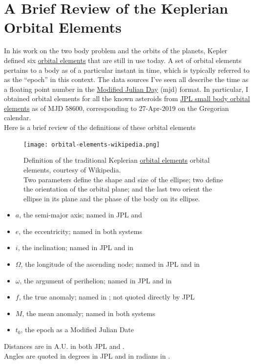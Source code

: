 \section{A Brief Review of the Keplerian Orbital Elements}
\label{section_orbital_elements}
In his work on the two body problem and the orbits of the planets, Kepler defined six 
\href{https://en.wikipedia.org/wiki/Orbital_elements}{orbital elements}
that are still in use today.
A set of orbital elements pertains to a body as of a particular instant in time, which is typically referred to as the ``epoch'' in this context.
The data sources I've seen all describe the time as a floating point number in the \href{https://en.wikipedia.org/wiki/Julian_day}{Modified Julian Day} (mjd) format.
In particular, I obtained orbital elements for all the known asteroids from \href{https://ssd.jpl.nasa.gov/?sb_elem}{JPL small body orbital elements}
as of MJD 58600, corresponding to 27-Apr-2019 on the Gregorian calendar.\\
Here is a brief review of the definitions of these orbital elements

\begin{figure}
\begin{center}
\texttt{[image: orbital-elements-wikipedia.png]}
\caption{Definition of the traditional Keplerian
\href{https://en.wikipedia.org/wiki/Orbital_elements}{orbital elements}
orbital elements, courtesy of Wikipedia.\\
Two parameters define the shape and size of the ellipse;
two define the orientation of the orbital plane; 
and the last two orient the ellipse in its plane and the phase of the body on its ellipse.}
\end{center}
\end{figure}

\begin{samepage}
\begin{itemize}
\item $a$, the semi-major axis; named  in JPL and 
\item $e$, the eccentricity; named  in both systems
\item $i$, the inclination; named  in JPL and  in 
\item $\Omega$, the longitude of the ascending node; named  in JPL and  in 
\item $\omega$, the argument of perihelion; named  in JPL and  in 
\item $f$, the true anomaly; named  in ; not quoted directly by JPL
\item $M$, the mean anomaly; named  in both systems
\item $t_0$, the epoch as a Modified Julian Date
\end{itemize}
\end{samepage}
Distances are in A.U. in both JPL and .  \\
Angles are quoted in degrees in JPL and in radians in .

